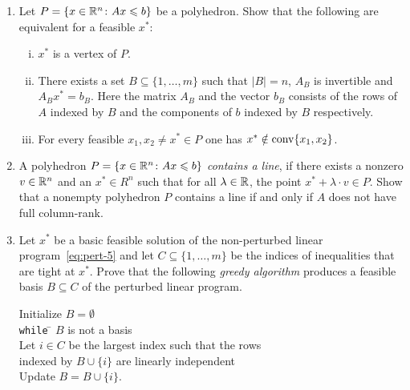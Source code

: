 \begin{enumerate}
\item Let $P = \{ x \in \mathbb{R}^n \colon Ax\leqslant b\}$ be a polyhedron. Show that the
  following are equivalent for a feasible $x^*$:
  \begin{enumerate}[i)] 
  \item $x^*$ is a vertex of $P$. 
  \item There exists a set $B\subseteq \{1,\ldots,m\}$ such that $|B| = n$, $A_B$  is
    invertible and $A_B x^* = b_B$. Here the matrix $A_B$ and the
    vector $b_B$ consists of the rows of $A$ indexed by $B$ and the
    components of $b$ indexed by $B$ respectively. 
  \item For every feasible $x_1, x_2 \neq x^* \in P$ one has $x^* \notin
    \operatorname{conv}\{x_1,x_2\}$. 
  \end{enumerate}  \label{i:item:1} 

\item A polyhedron $P = \{x \in \mathbb{R}^n \colon Ax\leqslant b\}$ \emph{contains a
    line}, if there exists a nonzero $v \in \mathbb{R}^n$ and an $x^* \in R
^n$ such that for all $\lambda \in \mathbb{R}$, the point $x^* + \lambda\cdot v \in P$. Show
that a nonempty polyhedron $P$ contains a line if and only if $A$ does not have full
column-rank. \label{xitem:10}
\item \label{item:pert-3} Let $x^*$ be a basic feasible solution of the non-perturbed linear program~\eqref{eq:pert-5} and let $C\subseteq \{1,\dots,m\}$ be the indices of inequalities that are tight at $x^*$. Prove that the following \emph{greedy algorithm} produces a feasible basis $B\subseteq C$ of the perturbed linear program.
 \begin{tabbing}
    Initialize $B = \emptyset$ \\
    {\tt while} \= $B$ is not a basis \\ 
      \> Let $i\in C$ be the largest index such that the rows \\
      \>  indexed by  $B \cup\{i\}$ are linearly independent \\[.1ex]
      \> Update $B = B \cup\{i\}$. 
    \end{tabbing}
\end{enumerate}




